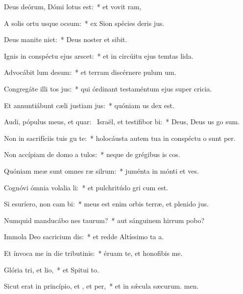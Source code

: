 \item Deus deórum, Dómi lotus est:~* et vovit ram,
\item A solis ortu usque  ocsum:~* ex Sion spécies deris jus.
\item Deus manite niet:~* Deus noster et  sibit.
\item Ignis in conspéctu ejus arscet:~* et in circúitu ejus temtas lida.
\item Advocábit lum desum:~* et terram discérnere pulum um.
\item Congregáte illi tos jus:~* qui órdinant testaméntum ejus super cricia.
\item Et annuntiábunt cæli justiam jus:~* quóniam us dex est.
\item Audi, pópulus meus, et quar:~\pscross{} Israël, et testifibor bi:~* Deus, Deus us go sum.
\item Non in sacrifíciis tuis gu te:~* holocáusta autem tua in conspéctu o sunt per.
\item Non accípiam de domo a tulos:~* neque de grégibus is cos.
\item Quóniam meæ sunt omnes ræ silrum:~* juménta in mónti et ves.
\item Cognóvi ómnia volalia li:~* et pulchritúdo gri cum est.
\item Si esuríero, non cam bi:~* meus est enim orbis terræ, et plenido jus.
\item Numquid manducábo nes taurum?~* aut sánguinem hirrum pobo?
\item Immola Deo sacricium dis:~* et redde Altíssimo ta a.
\item Et ínvoca me in die tributinis:~* éruam te, et honofibis me.
\item Glória tri, et lio,~* et Spitui to.
\item Sicut erat in princípio, et , et per,~* et in sǽcula sæcurum. men.

